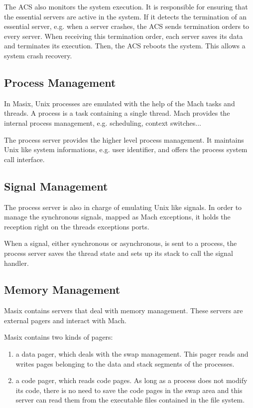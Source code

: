 	The ACS also monitors the system execution. It is responsible for
ensuring that the essential servers are active in the system. If it detects
the termination of an essential server, e.g. when a server crashes, the ACS
sends termination orders to every server. When receiving this termination
order, each server saves its data and terminates its execution. Then, the
ACS reboots the system. This allows a system crash recovery.

\subsection {Process Management}

	In Masix, Unix processes are emulated with the help of the Mach
tasks and threads. A process is a task containing a single thread. Mach
provides the internal process management, e.g. scheduling, context switches...

	The process server provides the higher level process management. It
maintains Unix like system informations, e.g. user identifier, and offers
the process system call interface.

\subsection {Signal Management}

	The process server is also in charge of emulating Unix like signals.
In order to manage the synchronous signals, mapped as Mach exceptions, it
holds the reception right on the threads exceptions ports.

	When a signal, either synchronous or asynchronous, is sent to a
process, the process server saves the thread state and sets up its stack
to call the signal handler.

\subsection {Memory Management}

	Masix contains servers that deal with memory management. These
servers are external pagers and interact with Mach.

	Masix contains two kinds of pagers:
\begin {enumerate}
\item a data pager, which deals with the swap management. This pager reads
and writes pages belonging to the data and stack segments of the processes.
\item a code pager, which reads code pages. As long as a process does not
modify its code, there is no need to save the code pages in the swap area and
this server can read them from the executable files contained in the file
system.
\end {enumerate}

